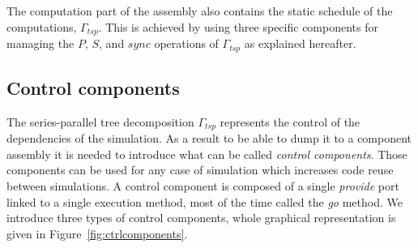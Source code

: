 


The computation part of the assembly also contains the static schedule
of the computations, \ie $\Gamma_{tsp}$. This is achieved by using
three specific components for managing the $P$, $S$, and $sync$
operations of $\Gamma_{tsp}$ as explained hereafter.

\subsection{Control components}
The series-parallel tree decomposition $\Gamma_{tsp}$ represents the
control of the dependencies of the simulation. As a result to be able
to dump it to a component assembly it is needed to introduce what can
be called \emph{control components}. Those components can be used for
any case of simulation which increases code reuse between
simulations. A control component is composed of a single
\emph{provide} port linked to a single execution method, most of the
time called the \emph{go} method. We introduce three types of control
components, whole graphical representation is given in Figure~\ref{fig:ctrlcomponents}.

